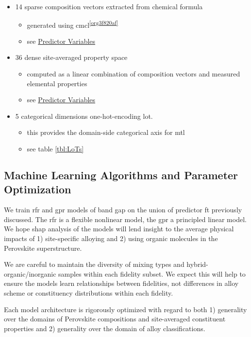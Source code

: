 \documentclass[aip, jmp, amsmath, amssymb, nofootinbib]{revtex4-2}
\begin{document}
\begin{itemize}
\item 14 sparse composition vectors extracted from chemical formula
\begin{itemize}
\item generated using cmcl\textsuperscript{\ref{org3f820af}}
\item see \hyperref[sec:orgff08faf]{Predictor Variables}
\end{itemize}
\item 36 dense site-averaged property space
\begin{itemize}
\item computed as a linear combination of composition vectors and
measured elemental properties\cite{mentel-2014}
\item see \hyperref[sec:orgff08faf]{Predictor Variables}
\end{itemize}
\item 5 categorical dimensions one-hot-encoding \gls{lot}.
\begin{itemize}
\item this provides the domain-side categorical axis for \gls{mtl}
\item see table \ref{tbl:LoTs}
\end{itemize}
\end{itemize}

\subsection*{Machine Learning Algorithms and Parameter Optimization}
\label{sec:org0ef3a1f}
We train \acrshort{rfr} and \acrshort{gpr} models of band gap on the union of predictor
\gls{ft} previously discussed. The \acrshort{rfr} is a flexible nonlinear model,
the \acrshort{gpr} a principled linear model. We hope \Acrfull{shap} analysis of the models will lend insight to the
average physical impacts of 1) site-specific alloying and 2) using
organic molecules in the Perovskite superstructure.

We are careful to maintain the diversity of mixing types and
hybrid-organic/inorganic samples within each fidelity subset. We
expect this will help to ensure the models learn relationships between
fidelities, not differences in alloy scheme or constituency
distributions within each fidelity.

Each model architecture is rigorously optimized with regard to both 1)
generality over the domains of Perovskite compositions and
site-averaged constituent properties and 2) generality over the domain
of alloy classifications.
\end{document}
